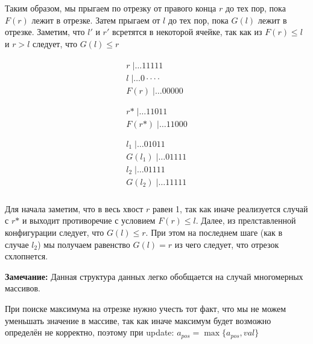 
Таким образом, мы прыгаем по отрезку от правого конца $r$ до тех пор, пока $F(r)$ лежит в отрезке. Затем прыгаем от $l$ до тех пор, пока $G(l)$ лежит в отрезке. Заметим, что $l'$ и $r'$ всретятся в некоторой ячейке, так как из $F(r) \leq l$ и $r > l$ следует, что $G(l) \leq r$
\newline \begin{minipage}{0.3\textwidth}
  \begin{flushleft}
	$$
    \begin{array}{r}
    \begin{array}{r}
    r \;| \ldots11111\\
    l \;| \ldots0\cdot \cdot \cdot \cdot\\
    F(r) \;| \ldots00000\\
    \end{array} \\
    \hline
    \begin{array}{r}
    r\text{*} \;| \ldots11011\\
    F(r\text{*}) \;| \ldots11000\\
    \end{array} \\
    \hline
    \begin{array}{r}
    l_1 \;| \ldots01011\\
    G(l_1) \;| \ldots01111\\
    l_2 \;| \ldots01111\\
    G(l_2) \;| \ldots11111\\
    \end{array}
    \end{array}
    $$
  \end{flushleft}
\end{minipage}
\begin{minipage}{0.7\textwidth}
\vspace{2ex}
  \begin{flushright}
	Для начала заметим, что в весь хвост $r$ равен 1, так как иначе реализуется случай с $r\text{*}$ и выходит противоречие с условием $F(r) \leq l$. Далее, из прелставленной конфигурации следует, что $G(l) \leq r$. При этом на последнем шаге (как в случае $l_2$) мы получаем равенство $G(l)=r$ из чего следует, что отрезок схлопнется.
  \end{flushright}
\end{minipage}
\par \textbf{Замечание:} Данная структура данных легко обобщается на случай многомерных массивов.
\\ \par \noindent При поиске максимума на отрезке нужно учесть тот факт, что мы не можем уменьшать значение в массиве, так как иначе максимум будет возможно определён не корректно, поэтому при update: $a_{pos} = \max \{a_{pos},val\}$

